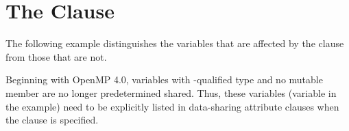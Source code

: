 \pagebreak
\chapter{The  Clause}
\label{chap:default_none}

The following example distinguishes the variables that are affected by the  
clause from those that are not. 

\ccppspecificstart
Beginning with OpenMP 4.0, variables with -qualified type and no mutable member 
are no longer predetermined shared.  Thus, these variables (variable  in the example) 
need to be explicitly listed
in data-sharing attribute clauses when the  clause is specified.

\ccppspecificend



